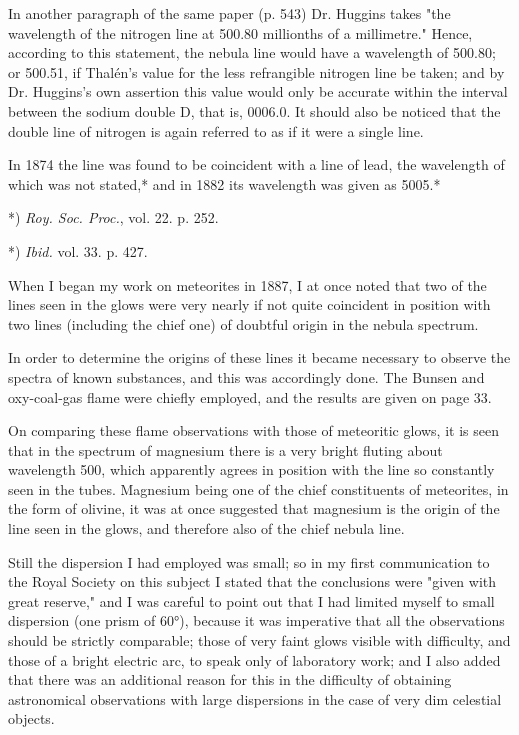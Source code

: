 \documentclass[a4paper, 12pt, oneside, polutonikogreek, english]{article}
\begin{document}
In another paragraph of the same paper (p. 543) Dr. Huggins takes "the wavelength of the nitrogen line at 500.80 millionths of a millimetre." Hence, according to this statement, the nebula line would have a wavelength of 500.80; or 500.51, if Thalén's value for the less refrangible nitrogen line be taken; and by Dr. Huggins's own assertion this value would only be accurate within the interval between the sodium double D, that is, 0006.0. It should also be noticed that the double line of nitrogen is again referred to as if it were a single line.

In 1874 the line was found to be coincident with a line of lead, the wavelength of which was not stated,* and in 1882 its wavelength was given as 5005.*

*) \emph{Roy. Soc. Proc.}, vol. 22. p. 252.

*) \emph{Ibid.} vol. 33. p. 427.

When I began my work on meteorites in 1887, I at once noted that two of the lines seen in the glows were very nearly if not quite coincident in position with two lines (including the chief one) of doubtful origin in the nebula spectrum.

In order to determine the origins of these lines it became necessary to observe the spectra of known substances, and this was accordingly done. The Bunsen and oxy-coal-gas flame were chiefly employed, and the results are given on page 33.

On comparing these flame observations with those of meteoritic glows, it is seen that in the spectrum of magnesium there is a very bright fluting about wavelength 500, which apparently agrees in position with the line so constantly seen in the tubes. Magnesium being one of the chief constituents of meteorites, in the form of olivine, it was at once suggested that magnesium is the origin of the line seen in the glows, and therefore also of the chief nebula line.

Still the dispersion I had employed was small; so in my first communication to the Royal Society on this subject I stated that the conclusions were "given with great reserve," and I was careful to point out that I had limited myself to small dispersion (one prism of 60°), because it was imperative that all the observations should be strictly comparable; those of very faint glows visible with difficulty, and those of a bright electric arc, to speak only of laboratory work; and I also added that there was an additional reason for this in the difficulty of obtaining astronomical observations with large dispersions in the case of very dim celestial objects.
\end{document}
